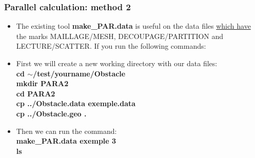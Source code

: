 \documentclass[10pt]{beamer}
\begin{document}
\begin{frame}
\frametitle{Parallel calculation: method 2}
\begin{block}{}

\begin{itemize}
\item The existing tool \textbf{make\_PAR.data} is useful on the data files \underline{which have} the marks MAILLAGE/MESH, DECOUPAGE/PARTITION and LECTURE/SCATTER. If you run the following commands: \\
\vspace{0.2cm}

\item First we will create a new working directory with our data files:\\
\textbf{cd $\sim$/test/yourname/Obstacle} \\
\textbf{mkdir PARA2} \\
\textbf{cd PARA2} \\
\textbf{cp ../Obstacle.data exemple.data}\\
\textbf{cp ../Obstacle.geo .}\\
\vspace{0.2cm}

\item Then we can run the command:\\
\textbf{make\_PAR.data exemple 3}\\
\textbf{ls}
\end{itemize}

\end{block}
\end{frame}
\end{document}
